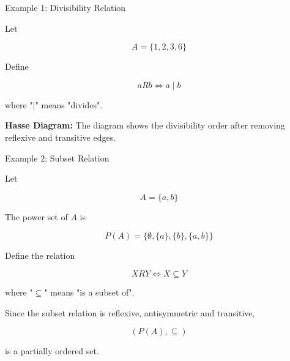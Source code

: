 \documentclass{beamer}
\begin{document}
\begin{frame}{Example 1: Divisibility Relation}

\small

Let

\[
A=\{1,2,3,6\}
\]

Define

\[
aRb \iff a\mid b
\]

where "$\mid$" means "divides".

\vspace{0.3cm}

\centering


\vspace{0.3cm}

\textbf{Hasse Diagram:} The diagram shows the divisibility order after
removing reflexive and transitive edges.

\end{frame}
\begin{frame}{Example 2: Subset Relation}

\small

Let

\[
A=\{a,b\}
\]

The power set of $A$ is

\[
P(A)=
\{\emptyset,\{a\},\{b\},\{a,b\}\}
\]

Define the relation

\[
XRY \iff X\subseteq Y
\]

where "$\subseteq$" means "is a subset of".

Since the subset relation is reflexive, antisymmetric and transitive,

\[
(P(A),\subseteq)
\]

is a partially ordered set.

\end{frame}
\end{document}
